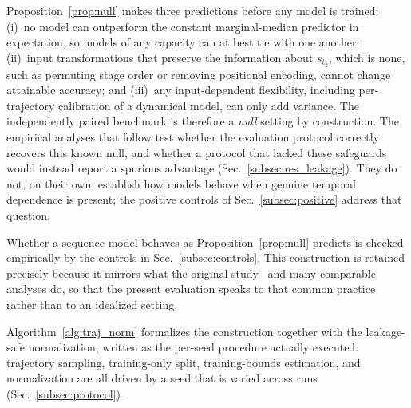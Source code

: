 \documentclass[pdflatex,sn-mathphys-num]{sn-jnl}
\theoremstyle{thmstyleone}%
\theoremstyle{thmstyletwo}%
\theoremstyle{thmstylethree}%
\begin{document}
Proposition~\ref{prop:null} makes three predictions before any model is trained: (i)~no model can outperform the constant marginal-median predictor in expectation, so models of any capacity can at best tie with one another; (ii)~input transformations that preserve the information about $s_{t_2}$, which is none, such as permuting stage order or removing positional encoding, cannot change attainable accuracy; and (iii)~any input-dependent flexibility, including per-trajectory calibration of a dynamical model, can only add variance. The independently paired benchmark is therefore a \emph{null} setting by construction. The empirical analyses that follow test whether the evaluation protocol correctly recovers this known null, and whether a protocol that lacked these safeguards would instead report a spurious advantage (Sec.~\ref{subsec:res_leakage}). They do not, on their own, establish how models behave when genuine temporal dependence is present; the positive controls of Sec.~\ref{subsec:positive} address that question.

Whether a sequence model behaves as Proposition~\ref{prop:null} predicts is checked empirically by the controls in Sec.~\ref{subsec:controls}. This construction is retained precisely because it mirrors what the original study~\cite{kanu2026transformer} and many comparable analyses do, so that the present evaluation speaks to that common practice rather than to an idealized setting.

Algorithm~\ref{alg:traj_norm} formalizes the construction together with the leakage-safe normalization, written as the per-seed procedure actually executed: trajectory sampling, training-only split, training-bounds estimation, and normalization are all driven by a seed that is varied across runs (Sec.~\ref{subsec:protocol}).
\end{document}
